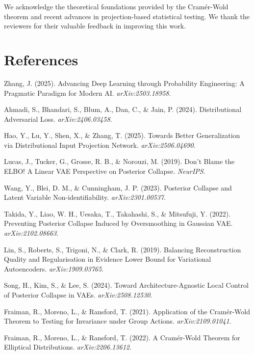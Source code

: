 \documentclass{article}
\begin{document}
\begin{ack}
We acknowledge the theoretical foundations provided by the Cramér-Wold theorem and recent advances in projection-based statistical testing. We thank the reviewers for their valuable feedback in improving this work.
\end{ack}

\section*{References}

{\small
\begin{thebibliography}{99}

 Zhang, J. (2025). Advancing Deep Learning through Probability Engineering: A Pragmatic Paradigm for Modern AI. \emph{arXiv:2503.18958}.

 Ahmadi, S., Bhandari, S., Blum, A., Dan, C., \& Jain, P. (2024). Distributional Adversarial Loss. \emph{arXiv:2406.03458}.

 Hao, Y., Lu, Y., Shen, X., \& Zhang, T. (2025). Towards Better Generalization via Distributional Input Projection Network. \emph{arXiv:2506.04690}.

 Lucas, J., Tucker, G., Grosse, R. B., \& Norouzi, M. (2019). Don't Blame the ELBO! A Linear VAE Perspective on Posterior Collapse. \emph{NeurIPS}.

 Wang, Y., Blei, D. M., \& Cunningham, J. P. (2023). Posterior Collapse and Latent Variable Non-identifiability. \emph{arXiv:2301.00537}.

 Takida, Y., Liao, W. H., Uesaka, T., Takahashi, S., \& Mitsufuji, Y. (2022). Preventing Posterior Collapse Induced by Oversmoothing in Gaussian VAE. \emph{arXiv:2102.08663}.

 Lin, S., Roberts, S., Trigoni, N., \& Clark, R. (2019). Balancing Reconstruction Quality and Regularisation in Evidence Lower Bound for Variational Autoencoders. \emph{arXiv:1909.03765}.

 Song, H., Kim, S., \& Lee, S. (2024). Toward Architecture-Agnostic Local Control of Posterior Collapse in VAEs. \emph{arXiv:2508.12530}.

 Fraiman, R., Moreno, L., \& Ransford, T. (2021). Application of the Cramér-Wold Theorem to Testing for Invariance under Group Actions. \emph{arXiv:2109.01041}.

 Fraiman, R., Moreno, L., \& Ransford, T. (2022). A Cramér-Wold Theorem for Elliptical Distributions. \emph{arXiv:2206.13612}.


\end{thebibliography}}
\end{document}
